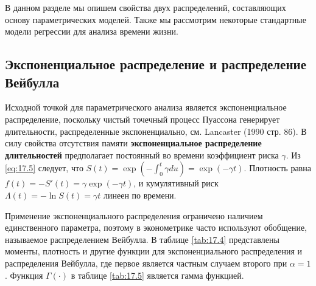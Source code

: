 \noindent
В данном разделе мы опишем свойства двух распределений, составляющих основу параметрических моделей. Также мы рассмотрим некоторые стандартные модели регрессии для анализа времени жизни.


\subsection{Экспоненциальное распределение и распределение Вейбулла}\label{sec:17.6.1}

\noindent
Исходной точкой для параметрического анализа является экспоненциальное распределение, поскольку чистый точечный процесс Пуассона генерирует длительности, распределенные экспоненциально, см. Lancaster (1990 стр. 86). В силу свойства отсутствия памяти \textbf{экспоненциальное распределение длительностей} предполагает постоянный во времени коэффициент риска $\gamma$. Из \ref{eq:17.5} следует, что $S(t)=\exp{(-\int^t_0\gamma d u)}=\exp{(-\gamma t)}$. Плотность равна $f(t)=-S'(t)=\gamma\exp{(-\gamma t)}$, и кумулятивный риск $\Lambda(t)=-\ln S(t)=\gamma t$ линеен по времени.

Применение экспоненциального распределения ограничено наличием единственного параметра, поэтому в эконометрике часто используют обобщение, называемое распределением Вейбулла. В таблице \ref{tab:17.4} представлены моменты, плотность и другие функции для экспоненциального распределения и распределения Вейбулла, где первое является частным случаем второго при $\alpha=1$. Функция $\Gamma(\cdot)$ в таблице \ref{tab:17.5} является гамма функцией.

